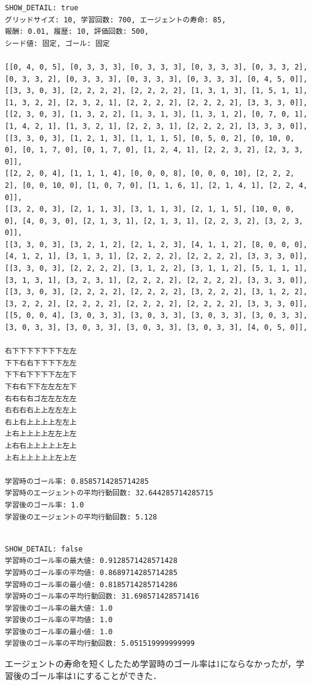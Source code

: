 \documentclass[a4j,11pt]{jarticle}
\begin{document}
\begin{verbatim}
SHOW_DETAIL: true
グリッドサイズ: 10, 学習回数: 700, エージェントの寿命: 85,
報酬: 0.01, 履歴: 10, 評価回数: 500,
シード値: 固定, ゴール: 固定

[[0, 4, 0, 5], [0, 3, 3, 3], [0, 3, 3, 3], [0, 3, 3, 3], [0, 3, 3, 2], [0, 3, 3, 2], [0, 3, 3, 3], [0, 3, 3, 3], [0, 3, 3, 3], [0, 4, 5, 0]],
[[3, 3, 0, 3], [2, 2, 2, 2], [2, 2, 2, 2], [1, 3, 1, 3], [1, 5, 1, 1], [1, 3, 2, 2], [2, 3, 2, 1], [2, 2, 2, 2], [2, 2, 2, 2], [3, 3, 3, 0]],
[[2, 3, 0, 3], [1, 3, 2, 2], [1, 3, 1, 3], [1, 3, 1, 2], [0, 7, 0, 1], [1, 4, 2, 1], [1, 3, 2, 1], [2, 2, 3, 1], [2, 2, 2, 2], [3, 3, 3, 0]],
[[3, 3, 0, 3], [1, 2, 1, 3], [1, 1, 1, 5], [0, 5, 0, 2], [0, 10, 0, 0], [0, 1, 7, 0], [0, 1, 7, 0], [1, 2, 4, 1], [2, 2, 3, 2], [2, 3, 3, 0]],
[[2, 2, 0, 4], [1, 1, 1, 4], [0, 0, 0, 8], [0, 0, 0, 10], [2, 2, 2, 2], [0, 0, 10, 0], [1, 0, 7, 0], [1, 1, 6, 1], [2, 1, 4, 1], [2, 2, 4, 0]],
[[3, 2, 0, 3], [2, 1, 1, 3], [3, 1, 1, 3], [2, 1, 1, 5], [10, 0, 0, 0], [4, 0, 3, 0], [2, 1, 3, 1], [2, 1, 3, 1], [2, 2, 3, 2], [3, 2, 3, 0]],
[[3, 3, 0, 3], [3, 2, 1, 2], [2, 1, 2, 3], [4, 1, 1, 2], [8, 0, 0, 0], [4, 1, 2, 1], [3, 1, 3, 1], [2, 2, 2, 2], [2, 2, 2, 2], [3, 3, 3, 0]],
[[3, 3, 0, 3], [2, 2, 2, 2], [3, 1, 2, 2], [3, 1, 1, 2], [5, 1, 1, 1], [3, 1, 3, 1], [3, 2, 3, 1], [2, 2, 2, 2], [2, 2, 2, 2], [3, 3, 3, 0]],
[[3, 3, 0, 3], [2, 2, 2, 2], [2, 2, 2, 2], [3, 2, 2, 2], [3, 1, 2, 2], [3, 2, 2, 2], [2, 2, 2, 2], [2, 2, 2, 2], [2, 2, 2, 2], [3, 3, 3, 0]],
[[5, 0, 0, 4], [3, 0, 3, 3], [3, 0, 3, 3], [3, 0, 3, 3], [3, 0, 3, 3], [3, 0, 3, 3], [3, 0, 3, 3], [3, 0, 3, 3], [3, 0, 3, 3], [4, 0, 5, 0]],

右下下下下下下下左左
下下右右下下下下左左
下下右下下下下左左下
下右右下下左左左左下
右右右右ゴ左左左左左
右右右右上上左左左上
右上右上上上上左左上
上右上上上上左左上左
上右右上上上上上左上
上右上上上上上左上左

学習時のゴール率: 0.8585714285714285
学習時のエージェントの平均行動回数: 32.644285714285715
学習後のゴール率: 1.0
学習後のエージェントの平均行動回数: 5.128
\end{verbatim}

\begin{verbatim}

SHOW_DETAIL: false
学習時のゴール率の最大値: 0.9128571428571428
学習時のゴール率の平均値: 0.8689714285714285
学習時のゴール率の最小値: 0.8185714285714286
学習時のゴール率の平均行動回数: 31.698571428571416
学習後のゴール率の最大値: 1.0
学習後のゴール率の平均値: 1.0
学習後のゴール率の最小値: 1.0
学習後のゴール率の平均行動回数: 5.051519999999999
\end{verbatim}

エージェントの寿命を短くしたため学習時のゴール率は1にならなかったが，学習後のゴール率は1にすることができた．
\end{document}
